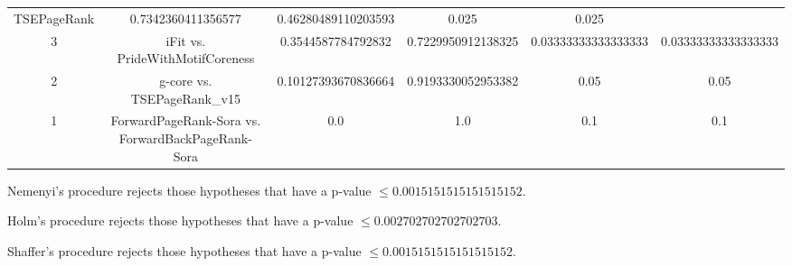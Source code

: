 \documentclass[a4paper,10pt]{article}
\begin{document}
\begin{landscape}
\begin{table}[!htp]
\begin{tabular}{cccccc}
TSEPageRank&0.7342360411356577&0.46280489110203593&0.025&0.025\\3&iFit vs. PrideWithMotifCoreness&0.3544587784792832&0.7229950912138325&0.03333333333333333&0.03333333333333333\\2&g-core vs. TSEPageRank_v15&0.10127393670836664&0.9193330052953382&0.05&0.05\\1&ForwardPageRank-Sora vs. ForwardBackPageRank-Sora&0.0&1.0&0.1&0.1\\\hline
\end{tabular}
\end{table}
Nemenyi's procedure rejects those hypotheses that have a p-value $\le0.0015151515151515152$.


Holm's procedure rejects those hypotheses that have a p-value $\le0.002702702702702703$.


Shaffer's procedure rejects those hypotheses that have a p-value $\le0.0015151515151515152$.



\end{landscape}
\end{document}
